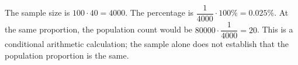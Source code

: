 The sample size is $100\cdot40=4000$. The percentage is $\dfrac{1}{4000}\cdot100\%=\boxed{0.025\%}$. At the same proportion, the population count would be $80000\cdot\dfrac{1}{4000}=\boxed{20}$. This is a conditional arithmetic calculation; the sample alone does not establish that the population proportion is the same.
